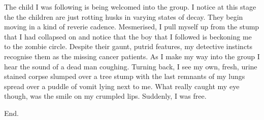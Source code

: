 The child I was following is being welcomed into the group. I
notice at this stage the the children are just rotting husks in
varying states of decay. They begin moving in a kind of reverie
cadence. Mesmerised, I pull myself up from the stump that I had
collapsed on and notice that the boy that I followed is beckoning
me to the zombie circle. Despite their gaunt, putrid features, my
detective instincts recognise them as the missing cancer patients.
As I make my way into the group I hear the sound of a dead man
coughing. Turning back, I see my own, fresh, urine stained corpse
slumped over a tree stump with the last remnants of my lungs spread
over a puddle of vomit lying next to me. What really caught my eye
though, was the smile on my crumpled lips. Suddenly, I was
free.



End. 
 



